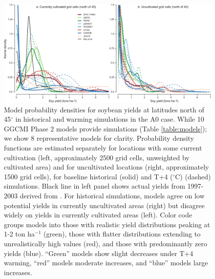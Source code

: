 \documentclass[gmd, manuscript]{copernicus} %
\begin{document}
\begin{figure}[ht]
\centering
  \includegraphics[width=15cm]{figures/soy_highlats.png}
  \caption{
  Model probability densities for soybean yields at latitudes north of 45$^\circ$ in historical and warming simulations in the A0 case. 
  While 10 GGCMI Phase 2 models provide simulations (Table \ref{table:models}); we show 8 representative models for clarity.
  Probability density functions are estimated separately for locations with some current cultivation (left, approximately 2500 grid cells, unweighted by cultivated area) and for uncultivated locations (right, approximately 1500 grid cells), for baseline historical (solid) and T+4 ($^{\circ}$C) (dashed) simulations. 
  Black line in left panel shows actual yields from 1997-2003 derived from \cite{Ray2012}. 
  For historical simulations, models agree on low potential yields in currently uncultivated areas (right) but disagree widely on yields in currently cultivated areas (left). 
  Color code groups models into those with realistic yield distributions peaking at 1-2 ton ha$^{-1}$ (green), those with flatter distributions extending to unrealistically high values (red), and those with predominantly zero yields (blue). 
  ``Green'' models show slight decreases under T+4 warming, ``red'' models moderate increases, and ``blue'' models large increases. 
  }
\label{fig:highlat}
\end{figure}
\end{document}
